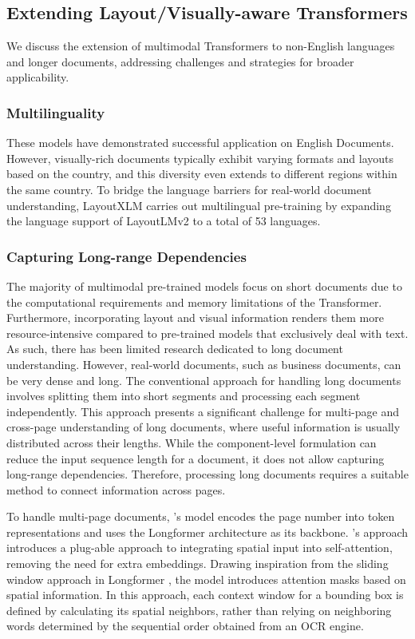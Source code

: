 \subsection{Extending Layout/Visually-aware Transformers}

We discuss the extension of multimodal Transformers to non-English languages and longer documents, addressing challenges and strategies for broader applicability.

\subsubsection{Multilinguality} 

These models have demonstrated successful application on English Documents. However, visually-rich documents typically exhibit varying formats and layouts based on the country, and this diversity even extends to different regions within the same country. To bridge the language barriers for real-world document understanding, LayoutXLM \citep{xu2021layoutxlm} carries out multilingual pre-training by expanding the language support of LayoutLMv2 to a total of 53 languages.

\subsubsection{Capturing Long-range Dependencies}

The majority of multimodal pre-trained models focus on short documents due to the computational requirements and memory limitations of the Transformer. Furthermore, incorporating layout and visual information renders them more resource-intensive compared to pre-trained models that exclusively deal with text. As such, there has been limited research dedicated to long document understanding. However, real-world documents, such as business documents, can be very dense and long. The conventional approach for handling long documents involves splitting them into short segments and processing each segment independently. This approach presents a significant challenge for multi-page and cross-page understanding of long documents, where useful information is usually distributed across their lengths. While the component-level formulation \citep{li2021structurallm, li2021selfdoc} can reduce the input sequence length for a document, it does not allow capturing long-range dependencies. Therefore, processing long documents requires a suitable method to connect information across pages.

To handle multi-page documents, \citet{pramanik2020towards}'s model encodes the page number into token representations and uses the Longformer architecture as its backbone. \citet{pham2022understanding}'s approach introduces a plug-able approach to integrating spatial input into self-attention, removing the need for extra embeddings. Drawing inspiration from the sliding window approach in Longformer \citep{beltagy2020longformer}, the model introduces attention masks based on spatial information. In this approach, each context window for a bounding box is defined by calculating its spatial neighbors, rather than relying on neighboring words determined by the sequential order obtained from an \ac{OCR} engine.


